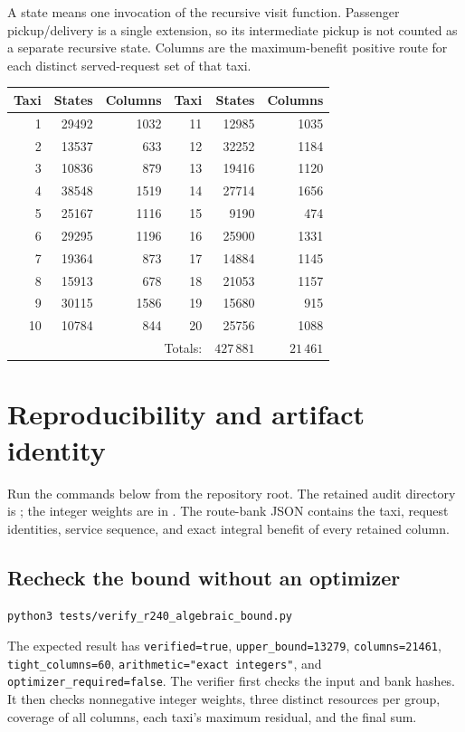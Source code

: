 \documentclass[11pt,a4paper]{article}
\begin{document}
A state means one invocation of the recursive visit function. Passenger
pickup/delivery is a single extension, so its intermediate pickup is not
counted as a separate recursive state. Columns are the maximum-benefit
positive route for each distinct served-request set of that taxi.
\begin{center}
\begin{tabular}{rrr@{\qquad}rrr}
\toprule
Taxi & States & Columns & Taxi & States & Columns\\
\midrule
1 & 29492 & 1032 & 11 & 12985 & 1035 \\
2 & 13537 & 633 & 12 & 32252 & 1184 \\
3 & 10836 & 879 & 13 & 19416 & 1120 \\
4 & 38548 & 1519 & 14 & 27714 & 1656 \\
5 & 25167 & 1116 & 15 & 9190 & 474 \\
6 & 29295 & 1196 & 16 & 25900 & 1331 \\
7 & 19364 & 873 & 17 & 14884 & 1145 \\
8 & 15913 & 678 & 18 & 21053 & 1157 \\
9 & 30115 & 1586 & 19 & 15680 & 915 \\
10 & 10784 & 844 & 20 & 25756 & 1088 \\
\midrule
\multicolumn{4}{r}{Totals:} & $427\,881$ & $21\,461$\\
\bottomrule
\end{tabular}
\end{center}

\section{Reproducibility and artifact identity}\label{sec:reproduce}

Run the commands below from the repository root. The retained audit directory
is ; the integer
weights are in
.
The route-bank JSON contains the taxi, request identities, service sequence,
and exact integral benefit of every retained column.

\subsection{Recheck the bound without an optimizer}
\begin{verbatim}
python3 tests/verify_r240_algebraic_bound.py
\end{verbatim}
The expected result has \texttt{verified=true}, \texttt{upper\_bound=13279},
\texttt{columns=21461}, \texttt{tight\_columns=60},
\texttt{arithmetic="exact integers"}, and \texttt{optimizer\_required=false}.
The verifier first checks the input and bank hashes. It then checks
nonnegative integer weights, three distinct resources per group, coverage
of all columns, each taxi's maximum residual, and the final sum.
\end{document}
